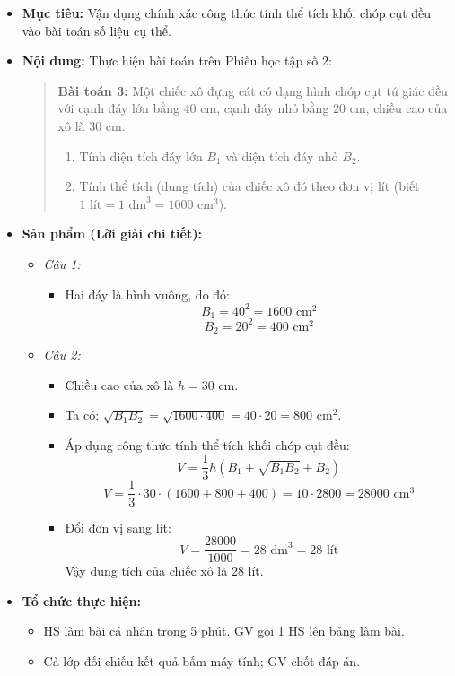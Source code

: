 \documentclass[12pt, a4paper]{article}
\begin{document}
\begin{itemize}[leftmargin=1.2cm]
    \item[a)] \textbf{Mục tiêu:} Vận dụng chính xác công thức tính thể tích khối chóp cụt đều vào bài toán số liệu cụ thể.
    \item[b)] \textbf{Nội dung:} Thực hiện bài toán trên Phiếu học tập số 2:
    \begin{quote}
        \textbf{Bài toán 3:} Một chiếc xô đựng cát có dạng hình chóp cụt tứ giác đều với cạnh đáy lớn bằng $40\text{ cm}$, cạnh đáy nhỏ bằng $20\text{ cm}$, chiều cao của xô là $30\text{ cm}$.
        \begin{enumerate}
            \item Tính diện tích đáy lớn $B_1$ và diện tích đáy nhỏ $B_2$.
            \item Tính thể tích (dung tích) của chiếc xô đó theo đơn vị lít (biết $1\text{ lít} = 1\text{ dm}^3 = 1000\text{ cm}^3$).
        \end{enumerate}
    \end{quote}

    \item[c)] \textbf{Sản phẩm (Lời giải chi tiết):}
    \begin{itemize}[leftmargin=0.6cm]
        \item \textit{Câu 1:}
        \begin{itemize}
            \item Hai đáy là hình vuông, do đó:
            $$B_1 = 40^2 = 1600\text{ cm}^2$$
            $$B_2 = 20^2 = 400\text{ cm}^2$$
        \end{itemize}
        \item \textit{Câu 2:}
        \begin{itemize}
            \item Chiều cao của xô là $h = 30\text{ cm}$.
            \item Ta có: $\sqrt{B_1 B_2} = \sqrt{1600 \cdot 400} = 40 \cdot 20 = 800\text{ cm}^2$.
            \item Áp dụng công thức tính thể tích khối chóp cụt đều:
            $$V = \dfrac{1}{3} h \left( B_1 + \sqrt{B_1 B_2} + B_2 \right)$$
            $$V = \dfrac{1}{3} \cdot 30 \cdot (1600 + 800 + 400) = 10 \cdot 2800 = 28000\text{ cm}^3$$
            \item Đổi đơn vị sang lít:
            $$V = \dfrac{28000}{1000} = 28\text{ dm}^3 = 28\text{ lít}$$
            Vậy dung tích của chiếc xô là $28$ lít.
        \end{itemize}
    \end{itemize}

    \item[d)] \textbf{Tổ chức thực hiện:}
    \begin{itemize}[leftmargin=0.6cm]
        \item HS làm bài cá nhân trong 5 phút. GV gọi 1 HS lên bảng làm bài.
        \item Cả lớp đối chiếu kết quả bấm máy tính; GV chốt đáp án.
    \end{itemize}
\end{itemize}
\end{document}
